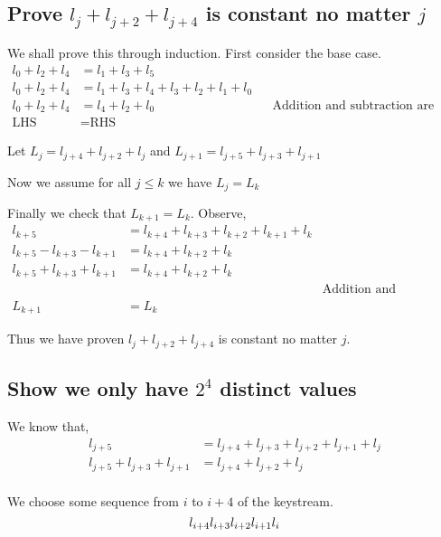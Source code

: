 \documentclass{article}
\begin{document}
\subsection{Prove $l_j+l_{j+2}+l_{j+4}$ is constant no matter $j$}
We shall prove this through induction. First consider the base case.
\begin{align*}
    l_0 + l_2 + l_4 &= l_1 + l_3 + l_5 \\
    l_0 + l_2 + l_4 &= l_1 + l_3 + l_4 + l_3 + l_2 + l_1 + l_0 \\
    l_0 + l_2 + l_4 &= l_4 + l_2 + l_0
    && \text{Addition and subtraction are equal in binary} \\
    \text{LHS} &= \text{RHS}
\end{align*}

Let $L_j = l_{j+4} + l_{j+2} + l_{j}$ and 
$L_{j+1} = l_{j+5} + l_{j+3} + l_{j+1}$

Now we assume for all $j \leq k$ we have $L_j = L_k$

Finally we check that $L_{k+1} = L_k$.
Observe,
\begin{align*}
    l_{k+5} &= l_{k+4} + l_{k+3} + l_{k+2} + l_{k+1} + l_{k} \\
    l_{k+5} - l_{k+3} - l_{k+1} &= l_{k+4} + l_{k+2} + l_{k} \\
    l_{k+5} + l_{k+3} + l_{k+1} &= l_{k+4} + l_{k+2} + l_{k} \\
    && \text{Addition and subtraction are equal in binary} \\
    L_{k+1} &= L_{k}
\end{align*}

Thus we have proven $l_j+l_{j+2}+l_{j+4}$ is constant no matter $j$.

\subsection{Show we only have $2^4$ distinct values}
We know that,
\begin{align*}
    l_{j+5} &= l_{j+4} + l_{j+3} + l_{j+2} + l_{j+1} + l_{j} \\
    l_{j+5} + l_{j+3} + l_{j+1} &= l_{j+4} + l_{j+2} + l_{j} \\
\end{align*}

We choose some sequence from $i$ to $i+4$ of the keystream. 
\begin{equation}
    l_{i+4} l_{i+3} l_{i+2} l_{i+1} l_{i} \\
\end{equation}
\end{document}
